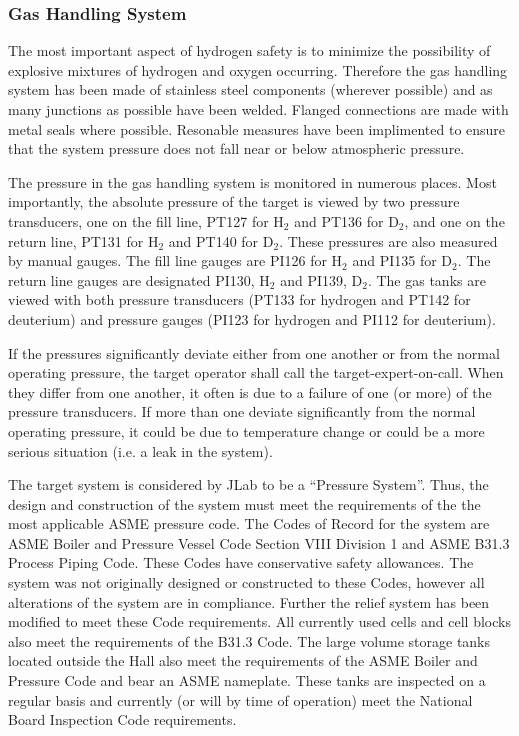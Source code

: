 \begin{safetyen}{0}{0}
\subsubsection{Gas Handling System}

The most important aspect of hydrogen safety is to minimize the possibility
of explosive mixtures of hydrogen and oxygen occurring. Therefore
the gas handling system has been made of stainless steel components
(wherever possible) and as many junctions as possible have been welded.
Flanged connections are made with metal seals where possible. Resonable
measures have been implimented to ensure that the system pressure
does not fall near or below atmospheric pressure.

The pressure in the gas handling system is monitored in numerous places.
Most importantly, the absolute pressure of the target is viewed by
two pressure transducers, one on the fill line, PT127 for H$_{2}$
and PT136 for D$_{2}$, and one on the return line, PT131 for H$_{2}$
and PT140 for D$_{2}$. These pressures are also measured by manual
gauges. The fill line gauges are PI126 for H$_{2}$ and PI135 for
D$_{2}$. The return line gauges are designated PI130, H$_{2}$ and
PI139, D$_{2}$. The gas tanks are viewed with both pressure transducers
(PT133 for hydrogen and PT142 for deuterium) and pressure gauges (PI123
for hydrogen and PI112 for deuterium).

If the pressures significantly deviate either from one another or
from the normal operating pressure, the target operator shall call
the target-expert-on-call. When they differ from one another, it often
is due to a failure of one (or more) of the pressure transducers.
If more than one deviate significantly from the normal operating pressure,
it could be due to temperature change or could be a more serious situation
(i.e. a leak in the system).

The target system is considered by JLab to be a ``Pressure System''.
Thus, the design and construction of the system must meet the requirements
of the the most applicable ASME pressure code. The Codes of Record
for the system are ASME Boiler and Pressure Vessel Code Section VIII
Division 1 and ASME B31.3 Process Piping Code. These Codes have conservative
safety allowances. The system was not originally designed or constructed
to these Codes, however all alterations of the system are in compliance.
Further the relief system has been modified to meet these Code requirements.
All currently used cells and cell blocks also meet the requirements
of the B31.3 Code. The large volume storage tanks located outside
the Hall also meet the requirements of the ASME Boiler and Pressure
Code and bear an ASME nameplate. These tanks are inspected on a regular
basis and currently (or will by time of operation) meet the National
Board Inspection Code requirements.
\end{safetyen}

